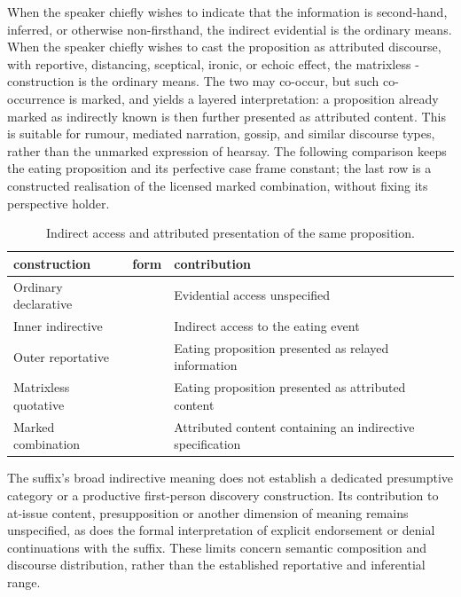 When the speaker chiefly wishes to indicate that the information is second-hand,
inferred, or otherwise non-firsthand, the indirect evidential is the ordinary
means. When the speaker chiefly wishes to cast the proposition as attributed
discourse, with reportive, distancing, sceptical, ironic, or echoic effect, the
matrixless -construction is the ordinary means. The two may co-occur,
but such co-occurrence is marked, and yields a layered interpretation: a
proposition already marked as indirectly known is then further presented as
attributed content. This is suitable for rumour, mediated narration, gossip, and
similar discourse types, rather than the unmarked expression of hearsay.
The following comparison keeps the eating proposition and its perfective
case frame constant; the last row is a constructed realisation of the
licensed marked combination, without fixing its perspective holder.

\begin{table}[htbp]
\footnotesize
\caption{Indirect access and attributed presentation of the same proposition.}
\label{tab:evidential-attribution-contrast}
\begin{tabularx}{\textwidth}{l L L}
\toprule
{\sc construction} & {\sc form} & {\sc contribution} \\
\midrule
Ordinary declarative &  &
Evidential access unspecified \\
Inner indirective &  &
Indirect access to the eating event \\
Outer reportative &  &
Eating proposition presented as relayed information \\
Matrixless quotative &  &
Eating proposition presented as attributed content \\
Marked combination &  &
Attributed content containing an indirective specification \\
\bottomrule
\end{tabularx}
\end{table}

The suffix's broad indirective meaning does not establish a dedicated
presumptive category or a productive first-person discovery construction.
Its contribution to at-issue content, presupposition or another dimension
of meaning remains unspecified, as does the formal interpretation of
explicit endorsement or denial continuations with the suffix. These limits concern semantic
composition and discourse distribution, rather than the established
reportative and inferential range.

